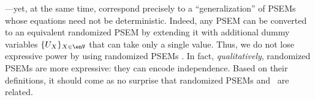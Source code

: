 \unskip---yet, at the same time, correspond precisely to a
``generalization'' of PSEMs whose equations need not be deterministic.
Indeed,
any PSEM can be
converted to an equivalent randomized PSEM by extending it 
with additional dummy variables $\{U_X\}_{X \in \enV}$ that can
take only a single value. 
%
%
Thus, we do not lose expressive power by using randomized PSEMs
\unskip. In fact, \emph{qualitatively}, 
randomized PSEMs are more expressive: they can encode independence.
Based on their definitions, it should come as no surprise that randomized PSEMs and \scibility\ are related.

